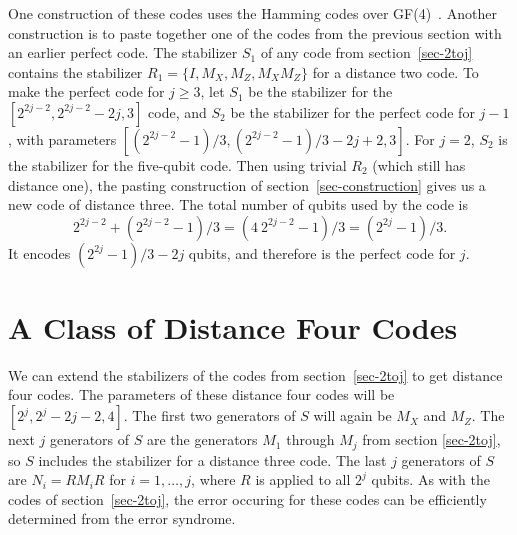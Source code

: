 One construction of these codes uses the Hamming codes over
GF(4)~\cite{calderbank-GF4}.  Another construction is to paste together one
of the codes from the previous section with an earlier perfect code.  The
stabilizer $S_1$ of any code from section~\ref{sec-2toj} contains the
stabilizer $R_1 = \{I, M_X, M_Z, M_X M_Z\}$ for a distance two code.  To
make the perfect code for $j \geq 3$, let $S_1$ be the stabilizer for the
$[2^{2j - 2}, 2^{2j - 2} - 2j, 3]$ code, and $S_2$ be the stabilizer for the
perfect code for $j-1$, with parameters $[(2^{2j-2}-1)/3, (2^{2j-2}-1)/3 - 2j +
2, 3]$.  For $j=2$, $S_2$ is the stabilizer for the five-qubit code.  Then
using trivial $R_2$ (which still has distance one), the pasting construction of
section~\ref{sec-construction} gives us a new code of distance three.  The
total number of qubits used by the code is
\begin{equation}
	2^{2j - 2} + (2^{2j-2}-1)/3 = (4\ 2^{2j-2} - 1)/3 = (2^{2j} - 1)/3.
\end{equation}
It encodes $(2^{2j}-1)/3 - 2j$ qubits, and therefore is the perfect code for
$j$.

\section{A Class of Distance Four Codes}

We can extend the stabilizers of the codes from section~\ref{sec-2toj} to
get distance four codes.  The parameters of these distance four codes will be
$[2^j, 2^j - 2j - 2, 4]$.  The first two generators of $S$ will again be $M_X$
and $M_Z$.  The next $j$ generators of $S$ are the generators $M_1$ through
$M_j$ from section \ref{sec-2toj}, so $S$ includes the stabilizer for a
distance three code.  The last $j$ generators of $S$ are $N_i = R M_i R$ for
$i = 1, \ldots, j$, where $R$ is applied to all $2^j$ qubits.  As with the
codes of section~\ref{sec-2toj}, the error occuring for these codes can
be efficiently determined from the error syndrome.

